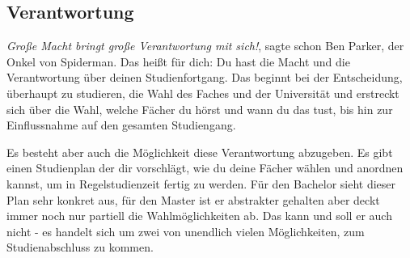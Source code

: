 \subsection{Verantwortung}
	\textit{Große Macht bringt große Verantwortung mit sich!}, sagte schon Ben Parker, der Onkel von Spiderman. Das heißt für dich: Du hast die Macht und die Verantwortung über deinen Studienfortgang. Das beginnt bei der Entscheidung, überhaupt zu studieren, die Wahl des Faches und der Universität und erstreckt sich über die Wahl, welche Fächer du hörst und wann du das tust, bis hin zur Einflussnahme auf den gesamten Studiengang.

	Es besteht aber auch die Möglichkeit diese Verantwortung abzugeben. Es gibt einen Studienplan der dir vorschlägt, wie du deine Fächer wählen und anordnen kannst, um in Regelstudienzeit fertig zu werden. Für den Bachelor sieht dieser Plan sehr konkret aus, für den Master ist er abstrakter gehalten aber deckt immer noch nur partiell die Wahlmöglichkeiten ab. Das kann und soll er auch nicht - es handelt sich um zwei von unendlich vielen Möglichkeiten, zum Studienabschluss zu kommen.